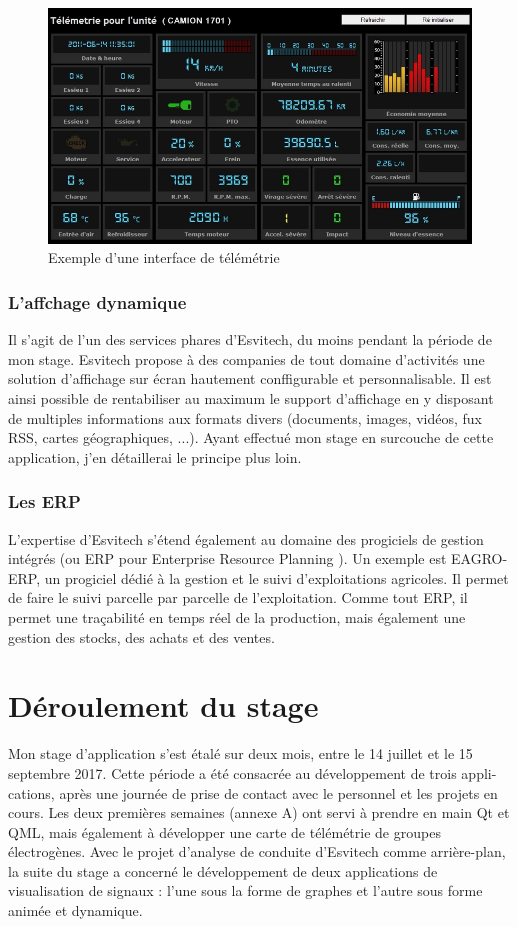 \documentclass[11pt]{report}
\begin{document}
\begin{figure}[H]
	\begin{center}
		\includegraphics[width=12cm]{images/telem.png}
		\caption{Exemple d'une interface de télémétrie}
		\label{fig:figure}
	\end{center}
\end{figure}

\subsubsection{L'affchage dynamique}
Il s'agit de l'un des services phares d'Esvitech, du moins pendant la période
de mon stage. Esvitech propose à des companies de tout domaine d'activités une
solution d'affichage sur écran hautement conffigurable et personnalisable. Il est ainsi
possible de rentabiliser au maximum le support d'affichage en y disposant de multiples informations aux formats divers (documents, images, vidéos, fux RSS, cartes
géographiques, ...). Ayant effectué mon stage en surcouche de cette application, j'en
détaillerai le principe plus loin.

\subsubsection{Les ERP}
L'expertise d'Esvitech s'étend également au domaine des progiciels de gestion
intégrés (ou ERP pour Enterprise Resource Planning ). Un exemple est EAGRO-
ERP, un progiciel dédié à la gestion et le suivi d'exploitations agricoles. Il permet de
faire le suivi parcelle par parcelle de l'exploitation. Comme tout ERP, il permet une
traçabilité en temps réel de la production, mais également une gestion des stocks,
des achats et des ventes.

\section{Déroulement du stage}
Mon stage d'application s'est étalé sur deux mois, entre le 14 juillet et le 15
septembre 2017. Cette période a été consacrée au développement de trois appli-
cations, après une journée de prise de contact avec le personnel et les projets en
cours.
Les deux premières semaines (annexe A) ont servi à prendre en main Qt et
QML, mais également à développer une carte de télémétrie de groupes électrogènes.
Avec le projet d'analyse de conduite d'Esvitech comme arrière-plan, la suite du stage
a concerné le développement de deux applications de visualisation de signaux : l'une
sous la forme de graphes et l'autre sous forme animée et dynamique.
\end{document}
